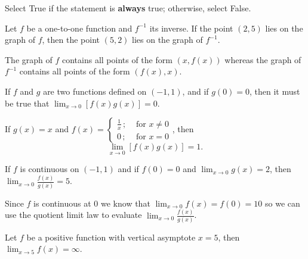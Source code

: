 \documentclass{ximera}
\author{Nela Lakos \and Kyle Parsons \and Bobby Ramsey}
\begin{document}
\begin{exercise}
	Select True if the statement is \textbf{always} true; otherwise, select False.

	Let $f$ be a one-to-one function and $f^{-1}$ its inverse.  If the point $(2,5)$ lies on the graph of $f$, then the point $(5,2)$ lies on the graph of $f^{-1}$.
	\begin{multipleChoice}
	\end{multipleChoice}
	\begin{feedback}
		The graph of $f$ contains all points of the form $\left(x,f(x)\right)$ whereas the graph of $f^{-1}$ contains all points of the form $\left(f(x),x\right)$.
	\end{feedback}

	\begin{exercise}
		If $f$ and $g$ are two functions defined on $\left(-1,1\right)$, and if $g(0) = 0$, then it must be true that $\displaystyle \lim_{x\to0}\left[f(x)g(x)\right]=0$.

		\begin{multipleChoice}
			\choice{True}
			\choice[correct]{False}
		\end{multipleChoice}
		\begin{feedback}
			If $g(x) = x$ and $f(x)=\begin{cases} \frac{1}{x} \,; & \text{ for } x\neq0 \\ 0 \,; & \text{ for } x=0 \end{cases}$, then \[ \lim_{x\to0}\left[f(x)g(x)\right] = 1. \]
		\end{feedback}

		\begin{exercise}
    			If $f$ is continuous on $\left(-1,1\right)$ and if $f(0) = 0$ and $\displaystyle \lim_{x\to0}g(x) = 2$, then $\displaystyle \lim_{x\to0}\frac{f(x)}{g(x)} = 5$.    
	    		\begin{multipleChoice}
    				\choice[correct]{True}
    				\choice{False}
    			\end{multipleChoice}
    
    			\begin{feedback}
    				Since $f$ is continuous at 0 we know that $\displaystyle \lim_{x\to0}f(x) = f(0) = 10$ so we can use the quotient limit law to evaluate $\displaystyle \lim_{x\to0}\frac{f(x)}{g(x)}$.
    			\end{feedback}
    
   	 		\begin{exercise}
    				Let $f$ be a positive function with vertical asymptote $x=5$, then $\displaystyle \lim_{x\to5}f(x) = \infty$.
    				\begin{multipleChoice}
    				\end{multipleChoice}
    

\end{exercise}
\end{exercise}
\end{exercise}
\end{exercise}
\end{document}
